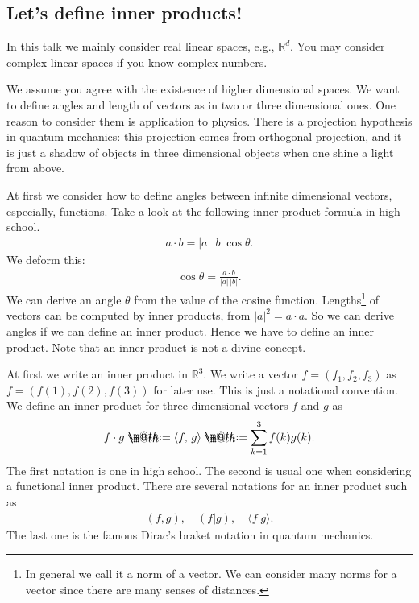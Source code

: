 \documentclass[openany, a4paper, oneside]{jsbook}
\makeatletter
\newcommand*{\defeq}{\mathrel{\rlap{%
\raisebox{0.3ex}{$\m@th\cdot$}}%
\raisebox{-0.3ex}{$\m@th\cdot$}}%
=}
\theoremstyle{break}
\theoremstyle{breakdefn}
\newcommand{\abs}[1]{\left|#1\right|}
\newcommand{\rbk}[1]{\left (#1\right)}
\newcommand{\bkt}[2]{\left\langle#1,\,#2\right\rangle}
\newcommand{\bbR}{\mathbb{R}}
\newcommand{\bbRd}{\mathbb{R}^d}
\makeatother
\begin{document}
\subsection{Let's define inner products!}


In this talk we mainly consider real linear spaces, e.g., $\bbRd$.
You may consider complex linear spaces if you know complex numbers.

We assume you agree with the existence of higher dimensional spaces.
We want to define angles and length of vectors as in two or three dimensional ones.
One reason to consider them is application to physics.
There is a projection hypothesis in quantum mechanics:
this projection comes from orthogonal projection,
and it is just a shadow of objects in three dimensional objects when
one shine a light from above.

At first we consider how to define angles between infinite dimensional vectors,
especially, functions.
Take a look at the following inner product formula in high school.
\begin{align}
 a \cdot b
 =
 \abs{a} \, \abs{b} \cos \theta.
\end{align}
We deform this:
\begin{align}
 \cos \theta
 =
 \frac{ a \cdot b} {\abs{a} \, \abs{b}}.
\end{align}
We can derive an angle $\theta$ from the value of the cosine function.
Lengths\footnote{In general we call it a norm of a vector.
We can consider many norms for a vector since there are many senses of distances.
 } of vectors can be computed by inner products,
from $\abs{a}^2 = a \cdot a$.
So we can derive angles if we can define an inner product.
Hence we have to define an inner product.
Note that an inner product is not a divine concept.

At first we write an inner product in $\bbR^3$.
We write a vector $f = (f_1, f_2, f_3)$ as $f = (f(1), f(2), f(3))$ for later use.
This is just a notational convention.
We define an inner product for three dimensional vectors $f$ and $g$ as
\begin{align}
 f \cdot g
 \defeq
 \bkt{f}{g}
 \defeq
 \sum_{k=1}^3 f(k)g(k).
\end{align}
The first notation is one in high school.
The second is usual one when considering a functional inner product.
There are several notations for an inner product such as
\begin{align}
 \rbk{f, g}, \quad \rbk{f | g}, \quad \langle f | g \rangle.
\end{align}
The last one is the famous Dirac's braket notation in quantum mechanics.
\end{document}
